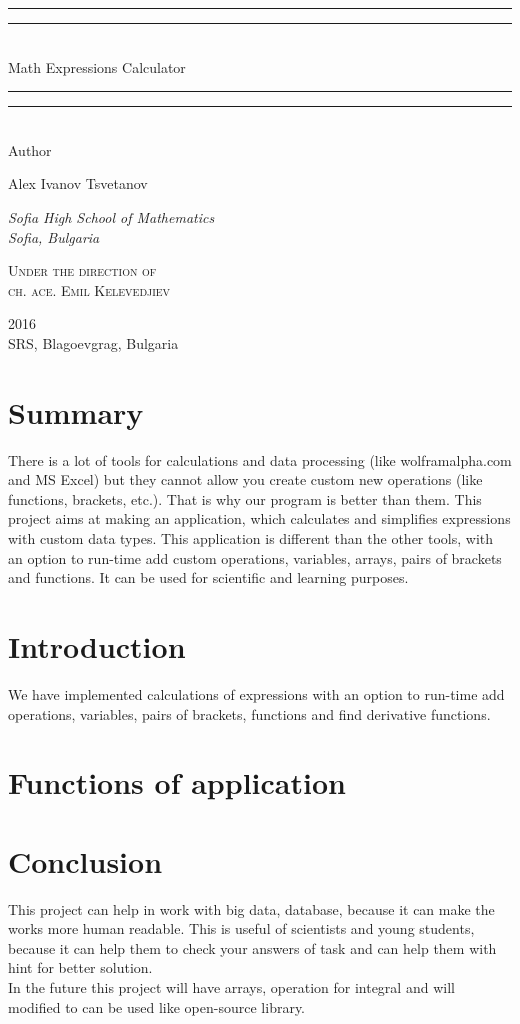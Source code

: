 \documentclass{book}
\newcommand*{\titleGP}{\begingroup
\centering
\vspace*{\baselineskip}

\rule{\textwidth}{1.6pt}\vspace*{-\baselineskip}\vspace*{2pt}
\rule{\textwidth}{0.4pt}\\[\baselineskip]

{\LARGE Math Expressions Calculator}\\[0.2\baselineskip]

\rule{\textwidth}{0.4pt}\vspace*{-\baselineskip}\vspace{3.2pt}
\rule{\textwidth}{1.6pt}\\[\baselineskip] %

Author \\[\baselineskip]
{\Large Alex Ivanov Tsvetanov\\\par}
{\itshape Sofia High School of Mathematics \\ Sofia, Bulgaria\par}

\vspace*{2\baselineskip}

\scshape
Under the direction of \\
ch. ace. Emil Kelevedjiev \\\par

\vfill

{\scshape 2016} \\[0.3\baselineskip]
{\large SRS, Blagoevgrag, Bulgaria }\par

\endgroup}
\begin{document}
 

\pagestyle{empty}

\titleGP
\newpage

\section*{Summary}
There is a lot of tools for calculations and data processing (like wolframalpha.com and MS Excel) but they cannot allow you create custom new operations (like functions, brackets, etc.).
That is why our program is better than them.
This project aims at making an application, which calculates and simplifies expressions with custom data types. This application is different than the other tools, with an option to run-time add custom operations, variables, arrays, pairs of brackets and functions. It can be used for scientific and learning purposes.

\section*{Introduction}
We have implemented calculations of expressions with an option to run-time add operations, variables, pairs of brackets, functions and find derivative functions.

\section*{Functions of application}
\begin{table}[ht]
\centering
\end{table}
\section*{Conclusion}
	This project can help in work with big data, database, because it can make the works more human readable. This is useful of scientists and young students, because it can help them to check your answers of task and can help them with hint for better solution. \\
	In the future this project will have arrays, operation for integral and will modified to can be used like open-source library.
\end{document}
